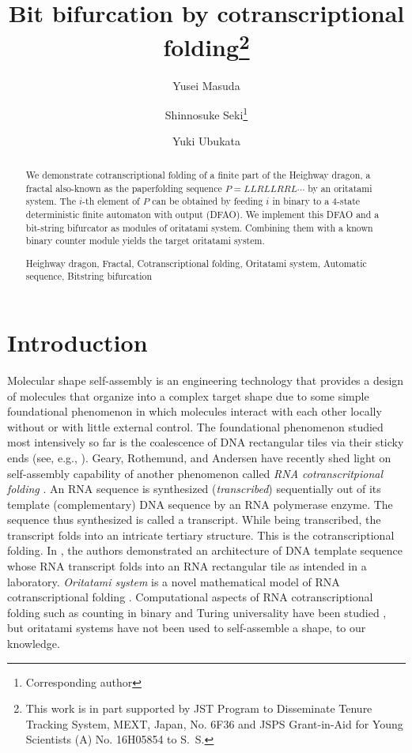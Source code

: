 \documentclass{llncs}
\title{Bit bifurcation by cotranscriptional folding\thanks{This work is in part supported by JST Program to Disseminate Tenure Tracking System, MEXT, Japan, No. 6F36 and JSPS Grant-in-Aid for Young Scientists (A) No. 16H05854 to S.~S.}}
\author{Yusei Masuda \and Shinnosuke Seki\thanks{Corresponding author} \and Yuki Ubukata}
\institute{
Department of Computer and Network Engineering, 
The University of Electro-Communications, 
1-5-1, Chofugaoka, Chofu, Tokyo, 1828585, Japan \email{s.seki@uec.ac.jp}
}
\begin{document}
\maketitle

\begin{abstract}
We demonstrate cotranscriptional folding of a finite part of the Heighway dragon, a fractal also-known as the paperfolding sequence $P = LLRLLRRL \cdots$ by an oritatami system. 
The $i$-th element of $P$ can be obtained by feeding $i$ in binary to a 4-state deterministic finite automaton with output (DFAO). 
We implement this DFAO and a bit-string bifurcator as modules of oritatami system. 
Combining them with a known binary counter module yields the target oritatami system. 
%
\begin{keywords}
Heighway dragon, 
Fractal, 
Cotranscriptional folding, 
Oritatami system, 
Automatic sequence, 
Bitstring bifurcation
\end{keywords}
\end{abstract}

	\section{Introduction}

Molecular shape self-assembly is an engineering technology that provides a design of molecules that organize into a complex target shape due to some simple foundational phenomenon in which molecules interact with each other locally without or with little external control. 
The foundational phenomenon studied most intensively so far is the coalescence of DNA rectangular tiles via their sticky ends (see, e.g., \cite{EvansPhD,Patitz2016,RoPaWi2004}). 
Geary, Rothemund, and Andersen have recently shed light on self-assembly capability of another phenomenon called \textit{RNA cotranscritpional folding} \cite{GeRoAn2014}. 
An RNA sequence is synthesized (\textit{transcribed}) sequentially out of its template (complementary) DNA sequence by an RNA polymerase enzyme. 
The sequence thus synthesized is called a transcript. 
While being transcribed, the transcript folds into an intricate tertiary structure. 
This is the cotranscriptional folding. 
In \cite{GeRoAn2014}, the authors demonstrated an architecture of DNA template sequence whose RNA transcript folds into an RNA rectangular tile as intended in a laboratory. 
\textit{Oritatami system} is a novel mathematical model of RNA cotranscriptional folding \cite{GeMeScSe2016}. 
Computational aspects of RNA cotranscriptional folding such as counting in binary and Turing universality have been studied  \cite{GeMeScSe2017,GeMeScSe2016,HaKiOtSe2016,AnttiPhD}, but oritatami systems have not been used to self-assemble a shape, to our knowledge. 
\end{document}

